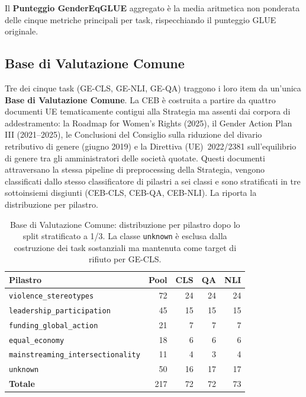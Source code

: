 \documentclass[pdflatex, sn-apa]{sn-jnl}%
\theoremstyle{thmstyleone}%
\theoremstyle{thmstyletwo}%
\theoremstyle{thmstylethree}%
\begin{document}
Il \textbf{Punteggio GenderEqGLUE} aggregato è la media aritmetica non ponderata
delle cinque metriche principali per task, rispecchiando il punteggio GLUE
originale.

\subsection{Base di Valutazione Comune}
\label{sec:bench:ceb}

Tre dei cinque task (GE-CLS, GE-NLI, GE-QA) traggono i loro item da un'unica
\textbf{Base di Valutazione Comune}. La CEB è costruita a partire da quattro
documenti UE tematicamente contigui alla Strategia ma assenti dai corpora di
addestramento: la Roadmap for Women's Rights (2025), il Gender Action Plan III
(2021--2025), le Conclusioni del Consiglio sulla riduzione del divario
retributivo di genere (giugno 2019) e la Direttiva (UE)~2022/2381 sull'equilibrio
di genere tra gli amministratori delle società quotate. Questi documenti
attraversano la stessa pipeline di preprocessing della Strategia, vengono
classificati dallo stesso classificatore di pilastri a sei classi e sono
stratificati in tre sottoinsiemi disgiunti (CEB-CLS, CEB-QA, CEB-NLI). La
 riporta la distribuzione per pilastro.

\begin{table}[h]
\centering
\caption{Base di Valutazione Comune: distribuzione per pilastro dopo lo split
stratificato a 1/3. La classe \texttt{unknown} è esclusa dalla costruzione dei
task sostanziali ma mantenuta come target di rifiuto per GE-CLS.}
\label{tab:ceb}
\small
\begin{tabular}{@{}lrrrr@{}}
\toprule
Pilastro                              & Pool & CLS & QA & NLI \\
\midrule
\texttt{violence\_stereotypes}        & 72   & 24  & 24 & 24  \\
\texttt{leadership\_participation}    & 45   & 15  & 15 & 15  \\
\texttt{funding\_global\_action}      & 21   &  7  &  7 &  7  \\
\texttt{equal\_economy}               & 18   &  6  &  6 &  6  \\
\texttt{mainstreaming\_intersectionality} & 11 & 4  &  3 &  4  \\
\texttt{unknown}                      & 50   & 16  & 17 & 17  \\
\midrule
\textbf{Totale}                       & 217  & 72  & 72 & 73  \\
\bottomrule
\end{tabular}
\end{table}
\end{document}
